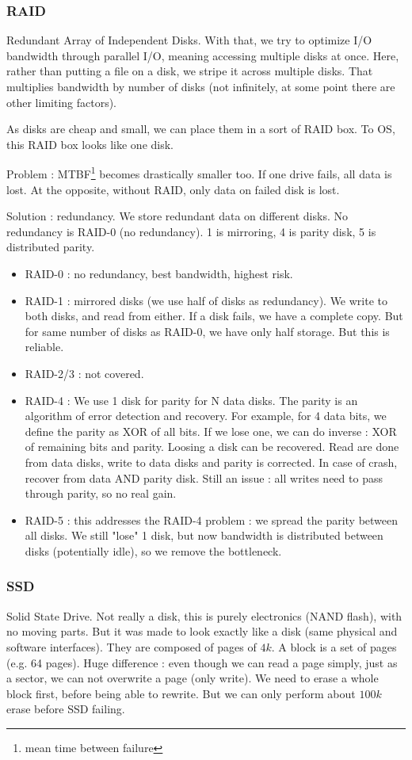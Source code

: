 \documentclass[12pt,a4paper]{article}
\begin{document}
\subsubsection{RAID}
Redundant Array of Independent Disks. With that, we try to optimize I/O bandwidth through parallel I/O, meaning accessing multiple disks at once. Here, rather than putting a file on a disk, we stripe it across multiple disks. That multiplies bandwidth by number of disks (not infinitely, at some point there are other limiting factors). 

As disks are cheap and small, we can place them in a sort of RAID box. To OS, this RAID box looks like one disk. 

Problem : MTBF\footnote{mean time between failure} becomes drastically smaller too. If one drive fails, all data is lost. At the opposite, without RAID, only data on failed disk is lost. 

Solution : redundancy. We store redundant data on different disks. No redundancy is RAID-0 (no redundancy). 1 is mirroring, 4 is parity disk, 5 is distributed parity. 

\begin{itemize}
	\item RAID-0 : no redundancy, best bandwidth, highest risk. 
	\item RAID-1 : mirrored disks (we use half of disks as redundancy). We write to both disks, and read from either. If a disk fails, we have a complete copy. But for same number of disks as RAID-0, we have only half storage. But this is reliable. 
	\item RAID-2/3 : not covered.
	\item RAID-4 : We use 1 disk for parity for N data disks. The parity is an algorithm of error detection and recovery. For example, for 4 data bits, we define the parity as XOR of all bits. If we lose one, we can do inverse : XOR of remaining bits and parity. Loosing a disk can be recovered. Read are done from data disks, write to data disks and parity is corrected. In case of crash, recover from data AND parity disk. Still an issue : all writes need to pass through parity, so no real gain. 
	\item RAID-5 : this addresses the RAID-4 problem : we spread the parity between all disks. We still "lose" 1 disk, but now bandwidth is distributed between disks (potentially idle), so we remove the bottleneck. 
\end{itemize}

\subsubsection{SSD}
Solid State Drive. Not really a disk, this is purely electronics (NAND flash), with no moving parts. But it was made to look exactly like a disk (same physical and software interfaces). They are composed of pages of $4k$. A block is a set of pages (e.g. 64 pages). Huge difference : even though we can read a page simply, just as a sector, we can not overwrite a page (only write). We need to erase a whole block first, before being able to rewrite. But we can only perform about $100k$ erase before SSD failing. 
\end{document}

